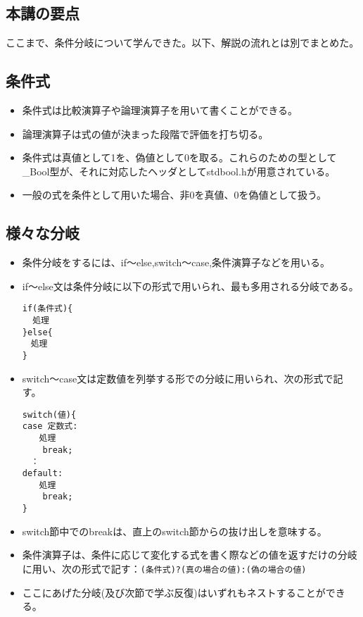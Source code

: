 \begin{shadebox}
\section*{本講の要点}
ここまで、条件分岐について学んできた。以下、解説の流れとは別でまとめた。
\subsection*{条件式}
\begin{itemize}
\item 条件式は比較演算子や論理演算子を用いて書くことができる。
\item 論理演算子は式の値が決まった段階で評価を打ち切る。
\item 条件式は真値として1を、偽値として0を取る。これらのための型として\_Bool型が、それに対応したヘッダとしてstdbool.hが用意されている。
\item 一般の式を条件として用いた場合、非0を真値、0を偽値として扱う。
\end{itemize}

\subsection*{様々な分岐}
\begin{itemize}
\item 条件分岐をするには、if〜else,switch〜case,条件演算子などを用いる。
\item if〜else文は条件分岐に以下の形式で用いられ、最も多用される分岐である。
\begin{verbatim}
if(条件式){
  処理
}else{
　処理
}
\end{verbatim}
\item switch〜case文は定数値を列挙する形での分岐に用いられ、次の形式で記す。
\begin{verbatim}
switch(値){
case 定数式:
　　処理
    break;
　：
default:
　　処理
    break;
}
\end{verbatim}
\item switch節中でのbreakは、直上のswitch節からの抜け出しを意味する。
\item 条件演算子は、条件に応じて変化する式を書く際などの値を返すだけの分岐に用い、次の形式で記す：\verb|(条件式)?(真の場合の値):(偽の場合の値)|
\item ここにあげた分岐(及び次節で学ぶ反復)はいずれもネストすることができる。
\end{itemize}
\end{shadebox}
